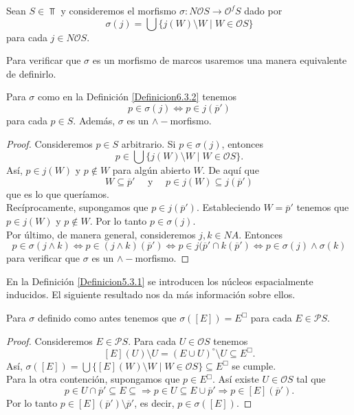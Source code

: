 \begin{dfn}\label{Definicion6.3.2}
    Sean $S\in \Top$ y consideremos el morfismo $\sigma\colon N\mathcal{O}S\to \mathcal{O}^fS$ dado por 
    \[
    \sigma(j)=\bigcup\{j(W)\setminus W\mid W\in \mathcal{O}S\}
    \]
    para cada $j\in N\mathcal{O}S$.
\end{dfn}

Para verificar que $\sigma$ es un morfismo de marcos usaremos una manera equivalente de definirlo.

\begin{lem}\label{Lema6.3.3}
    Para $\sigma$ como en la Definición \ref{Definicion6.3.2} tenemos 
    \[
    p\in \sigma(j)\Leftrightarrow p\in j(\overline{p}')
    \]
    para cada $p\in S$. Además, $\sigma$ es un $\wedge-$morfismo.
\end{lem}

\begin{proof}
    Consideremos $p\in S$ arbitrario. Si $p\in \sigma(j)$, entonces 
    \[
    p\in \bigcup\{j(W)\setminus W\mid W\in \mathcal{O}S\}.
    \]
    Así, $p\in j(W)$ y $p\notin W$ para algún abierto $W$. De aquí que 
    \[
    W\subseteq \overline{p}' \quad \mbox{ y }\quad p\in j(W)\subseteq j(\overline{p}')
    \]
    que es lo que queríamos.\\

    Recíprocamente, supongamos que $p\in j(\overline{p}')$. Estableciendo $W=\overline{p}'$ tenemos que $p\in j(W)$ y $p\notin W$. Por lo tanto $p\in \sigma(j)$.\\

    Por último, de manera general, consideremos $j, k\in NA$. Entonces
    \[
    p\in \sigma (j\wedge k)\Leftrightarrow p\in (j\wedge k)(\overline{p}')\Leftrightarrow p\in j(\overline{p}'\cap k(\overline{p}')\Leftrightarrow p\in \sigma(j)\wedge \sigma(k)
    \]
    para verificar que $\sigma$ es un $\wedge-$morfismo.
\end{proof}

En la Definición \ref{Definicion5.3.1} se introducen los núcleos espacialmente inducidos. El siguiente resultado nos da más información sobre ellos.

\begin{lem}\label{Lema6.3.4}
    Para $\sigma$ definido como antes tenemos que $\sigma([E])=E^\Box$ para cada $E\in \mathcal{P}S$.
\end{lem}

\begin{proof}
    Consideremos $E\in \mathcal{P}S$. Para cada $U\in \mathcal{O}S$ tenemos
    \[
    [E](U)\setminus U=(E\cup U)^\circ \setminus U\subseteq E^\Box.
    \]
    Así, $\sigma([E])=\bigcup\{[E](W)\setminus W\mid W\in \mathcal{O}S\}\subseteq E^\Box$ se cumple.\\

    Para la otra contención, supongamos que $p\in E^\Box$. Así existe $U\in \mathcal{O}S$ tal que
    \[
    p\in U\cap \overline{p}'\subseteq E\subseteq \Rightarrow p\in U\subseteq E\cup \overline{p}'\Rightarrow p\in [E](\overline{p}').
    \]
    Por lo tanto $p\in [E](\overline{p}')\setminus \overline{p}'$, es decir, $p\in \sigma([E])$.
\end{proof}


